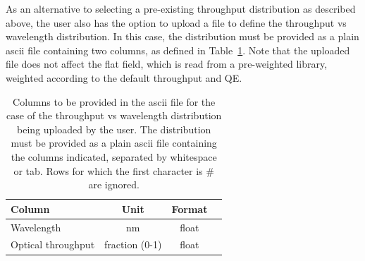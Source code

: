 \documentclass[11pt]{article}      %
\def\HCode#1{}
\def\htmlanchor#1{\HCode{<a id="#1"></a>}}
\begin{document}


\clearpage
\htmlanchor{throughputUploadFile}
As an alternative to selecting a pre-existing throughput distribution as described above, the user also has the option to upload a file to define the throughput vs wavelength distribution. In this case, the distribution must be provided as a plain ascii file containing two columns, as defined in Table~\ref{tab:throughputUploadFormat}. Note that the uploaded file does not affect the flat field, which is read from a pre-weighted library, weighted according to the default throughput and QE.

\begin{table}[hb]
  \begin{center}
  \caption{Columns to be provided in the ascii file for the case of the throughput vs wavelength distribution being uploaded by the user. The distribution must be provided as a plain ascii file containing the columns indicated, separated by whitespace or tab. Rows for which the first character is \# are ignored.}
  \begin{tabular}{| l | c | c | l |}
    \hline
Column & Unit & Format \\
    \hline
Wavelength & nm & float \\
Optical throughput & fraction (0-1) & float \\
    \hline
  \end{tabular}
  \label{tab:throughputUploadFormat}
\end{center}
\end{table}
\end{document}
